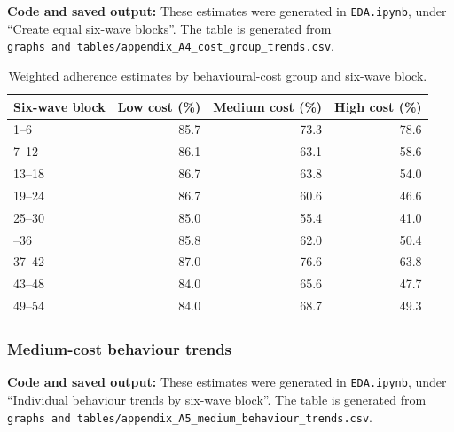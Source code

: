 \documentclass[
  12pt,
  a4paper,
]{article}
\begin{document}
\textbf{Code and saved output:} These estimates were generated in
\texttt{EDA.ipynb}, under ``Create equal six-wave blocks''. The table is
generated from \texttt{graphs\ and\ tables/appendix\_A4\_cost\_group\_trends.csv}.

\begin{longtable}[t]{lrrr}
\caption{\label{tab:cost-trends-appendix}Weighted adherence estimates by behavioural-cost group and six-wave block.}\\
\toprule
Six-wave block & Low cost (\%) & Medium cost (\%) & High cost (\%)\\
\midrule
1--6 & 85.7 & 73.3 & 78.6\\
7--12 & 86.1 & 63.1 & 58.6\\
13--18 & 86.7 & 63.8 & 54.0\\
19--24 & 86.7 & 60.6 & 46.6\\
25--30 & 85.0 & 55.4 & 41.0\\
\addlinespace
31--36 & 85.8 & 62.0 & 50.4\\
37--42 & 87.0 & 76.6 & 63.8\\
43--48 & 84.0 & 65.6 & 47.7\\
49--54 & 84.0 & 68.7 & 49.3\\
\bottomrule
\end{longtable}

\subsubsection{Medium-cost behaviour trends}\label{medium-cost-behaviour-trends}

\textbf{Code and saved output:} These estimates were generated in
\texttt{EDA.ipynb}, under ``Individual behaviour trends by six-wave block''. The
table is generated from
\texttt{graphs\ and\ tables/appendix\_A5\_medium\_behaviour\_trends.csv}.
\end{document}
